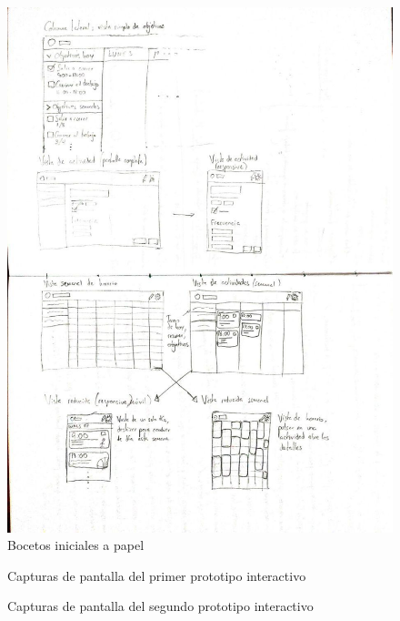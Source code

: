 \documentclass[10pt, a4paper]{aqademic}
\begin{document}
\begin{figure}[hbt!]
	\centering
	\includegraphics[scale=0.6]{img/sprint1-boceto-papel.jpg}
	\caption{Bocetos iniciales a papel}
\end{figure}

\begin{figure}[hbt!]
	\centering
	\caption{Capturas de pantalla del primer prototipo interactivo}
\end{figure}

\begin{figure}[hbt!]
	\centering
	\caption{Capturas de pantalla del segundo prototipo interactivo}
\end{figure}
\end{document}
